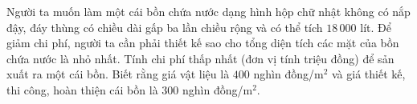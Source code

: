 \begin{ex}
Người ta muốn làm một cái bồn chứa nước dạng hình hộp chữ nhật không có nắp đậy, đáy thùng có chiều dài gấp ba lần chiều rộng và có thể tích $18\,000$ lít. Để giảm chi phí, người ta cần phải thiết kế sao cho tổng diện tích các mặt của bồn chứa nước là nhỏ nhất. Tính chi phí thấp nhất (đơn vị tính triệu đồng) để sản xuất ra một cái bồn. Biết rằng giá vật liệu là $400$ nghìn đồng/$\text{m}^2$ và giá thiết kế, thi công, hoàn thiện cái bồn là $300$ nghìn đồng/$\text{m}^2$.
\end{ex}

